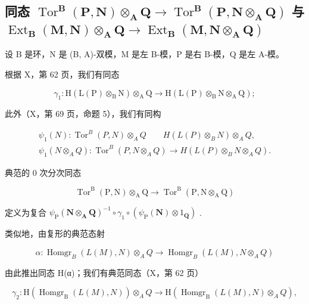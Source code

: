 \subsection{\texorpdfstring{同态 \(\operatorname{Tor}^{\mathbf{B}}(\mathbf{P},\mathbf{N})\otimes_{\mathbf{A}}\mathbf{Q}\to \operatorname{Tor}^{\mathbf{B}}(\mathbf{P},\mathbf{N}\otimes_{\mathbf{A}}\mathbf{Q})\) 与 \(\operatorname{Ext}_{\mathbf{B}}(\mathbf{M},\mathbf{N})\otimes_{\mathbf{A}}\mathbf{Q}\rightarrow \operatorname{Ext}_{\mathbf{B}}(\mathbf{M},\mathbf{N}\otimes_{\mathbf{A}}\mathbf{Q})\)}{张量积下的 Tor 与 Ext 同态}}

设 B 是环，N 是 (B, A)-双模，M 是左 B-模，P 是右 B-模，Q 是左 A-模。

根据 X，第 62 页，我们有同态

\[
\gamma_ {1}: \mathrm{H} (\mathrm{L} (\mathrm{P}) \otimes_ {\mathrm{B}} \mathrm{N}) \otimes_ {\mathrm{A}} \mathrm{Q} \rightarrow \mathrm{H} (\mathrm{L} (\mathrm{P}) \otimes_ {\mathrm{B}} \mathrm{N} \otimes_ {\mathrm{A}} \mathrm{Q});
\]

此外（X，第 69 页，命题 5），我们有同构

\[
\begin{array}{c} \psi_ {1} (N): \operatorname{Tor} ^ {B} (P, N) \otimes_ {A} Q \qquad H (L (P) \otimes_ {B} N) \otimes_ {A} Q, \\ \psi_ {1} (N \otimes_ {A} Q): \operatorname{Tor} ^ {B} (P, N \otimes_ {A} Q) \to H (L (P) \otimes_ {B} N \otimes_ {A} Q). \end{array}
\]

典范的 0 次分次同态

\[
\operatorname{Tor} ^ {\mathrm{B}} (\mathrm{P}, \mathrm{N}) \otimes_ {\mathrm{A}} \mathrm{Q} \rightarrow \operatorname{Tor} ^ {\mathrm{B}} (\mathrm{P}, \mathrm{N} \otimes_ {\mathrm{A}} \mathrm{Q})\tag{9}
\]

定义为复合 \(\psi_{\mathrm{P}}(\mathbf{N}\otimes_{\mathbf{A}}\mathbf{Q})^{-1}\circ \gamma_{1}\circ (\psi_{\mathrm{P}}(\mathbf{N})\otimes 1_{\mathbf{Q}})\) .

类似地，由复形的典范态射

\[
\alpha : \operatorname{Homgr} _ {B} (L (M), N) \otimes_ {A} Q \rightarrow \operatorname{Homgr} _ {B} (L (M), N \otimes_ {A} Q)
\]

由此推出同态 H(α)；我们有典范同态（X，第 62 页）

\[
\gamma_ {2}: \mathrm{H} (\operatorname{Homgr} _ {\mathrm{B}} (L (M), N)) \otimes_ {A} Q \rightarrow \mathrm{H} (\operatorname{Homgr} _ {\mathrm{B}} (L (M), N) \otimes_ {A} Q),
\]

